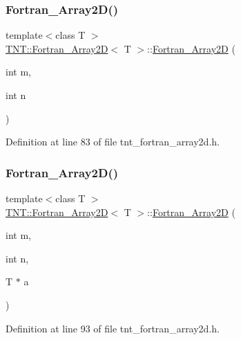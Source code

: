 \subsubsection{\texorpdfstring{Fortran\+\_\+\+Array2\+D()}{Fortran\_Array2D()}\hspace{0.1cm}{\footnotesize\ttfamily [2/5]}}
{\footnotesize\ttfamily template$<$class T $>$ \\
\hyperlink{classTNT_1_1Fortran__Array2D}{T\+N\+T\+::\+Fortran\+\_\+\+Array2D}$<$ T $>$\+::\hyperlink{classTNT_1_1Fortran__Array2D}{Fortran\+\_\+\+Array2D} (\begin{DoxyParamCaption}\item[{int}]{m,  }\item[{int}]{n }\end{DoxyParamCaption})}



Definition at line 83 of file tnt\+\_\+fortran\+\_\+array2d.\+h.

\mbox{\label{classTNT_1_1Fortran__Array2D_a8953e98e6c7ebdfaec743be1194638a0}} 
\subsubsection{\texorpdfstring{Fortran\+\_\+\+Array2\+D()}{Fortran\_Array2D()}\hspace{0.1cm}{\footnotesize\ttfamily [3/5]}}
{\footnotesize\ttfamily template$<$class T $>$ \\
\hyperlink{classTNT_1_1Fortran__Array2D}{T\+N\+T\+::\+Fortran\+\_\+\+Array2D}$<$ T $>$\+::\hyperlink{classTNT_1_1Fortran__Array2D}{Fortran\+\_\+\+Array2D} (\begin{DoxyParamCaption}\item[{int}]{m,  }\item[{int}]{n,  }\item[{T $\ast$}]{a }\end{DoxyParamCaption})}



Definition at line 93 of file tnt\+\_\+fortran\+\_\+array2d.\+h.

\mbox{\label{classTNT_1_1Fortran__Array2D_af81c83ddf0df807410c624814ee829c2}} 
